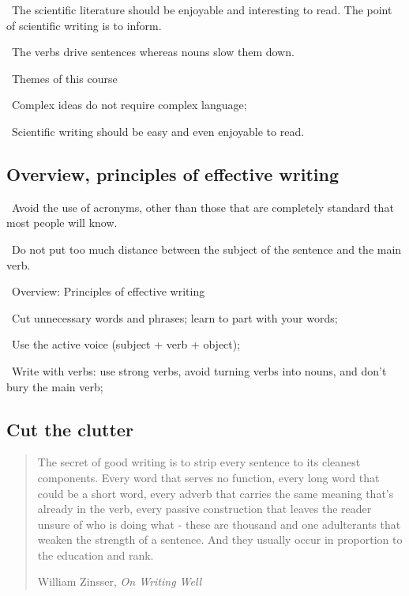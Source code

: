 \documentclass[a4paper,12pt]{article}
\begin{document}
\par\textbullet\ The scientific literature should be enjoyable and interesting to read. The point of scientific writing is to inform.

\par\textbullet\ The verbs drive sentences whereas nouns slow them down.

\par\textbullet\ Themes of this course
\par\quad\textopenbullet\ Complex ideas do not require complex language;
\par\quad\textopenbullet\ Scientific writing should be easy and even enjoyable to read.

\subsection{Overview, principles of effective writing}

\par\textbullet\ Avoid the use of acronyms, other than those that are completely standard that most people will know.

\par\textbullet\ Do not put too much distance between the subject of the sentence and the main verb.

\par\textbullet\ Overview: Principles of effective writing
\par\quad\textopenbullet\ Cut unnecessary words and phrases; learn to part with your words;
\par\quad\textopenbullet\ Use the active voice (subject + verb + object);
\par\quad\textopenbullet\ Write with verbs: use strong verbs, avoid turning verbs into nouns, and don't bury the main verb;

\newpage\subsection{Cut the clutter}

\begin{quote}
The secret of good writing is to strip every sentence to its cleanest components. 
Every word that serves no function, every long word that could be a short word, 
every adverb that carries the same meaning that's already in the verb, 
every passive construction that leaves the reader unsure of who is doing what
- these are thousand and one adulterants that weaken the strength of a sentence. 
And they usually occur in proportion to the education and rank. 
\begin{flushright}
William Zinsser, \textit{On Writing Well}
\end{flushright}
\end{quote}
\end{document}
